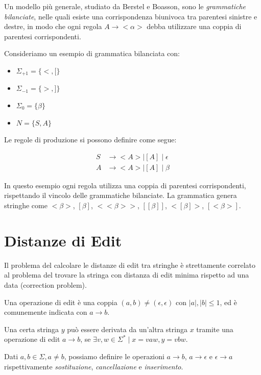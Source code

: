 \documentclass[a4paper,12pt]{report}
\begin{document}
    Un modello più generale, studiato da Berstel e Boasson, sono le \textit{grammatiche bilanciate}, nelle quali esiste una corrispondenza biunivoca tra parentesi sinistre e destre, in modo che ogni regola $A \rightarrow <\alpha>$ debba utilizzare una coppia di parentesi corrispondenti.
    
    Consideriamo un esempio di grammatica bilanciata con:
    \begin{itemize}
        \item $\Sigma_{+1} = \{<, [\}$
        \item $\Sigma_{-1} = \{>, ]\}$
        \item $\Sigma_0 = \{\beta\}$
        \item $N = \{S, A\}$
    \end{itemize}
    
    Le regole di produzione si possono definire come segue:
    
    \begin{align}
        S &\rightarrow < A > \mid [A] \mid \epsilon \\
        A &\rightarrow < A > \mid [A] \mid \beta
    \end{align}
    
    In questo esempio ogni regola utilizza una coppia di parentesi corrispondenti, rispettando il vincolo delle grammatiche bilanciate. La grammatica genera stringhe come $<\beta>$, $[\beta]$, $<<\beta>>$, $[[\beta]]$, $<[\beta]>$, $[<\beta>]$.

    \section{Distanze di Edit}

    Il problema del calcolare le distanze di edit tra stringhe è strettamente correlato al problema del trovare la stringa con distanza di edit minima rispetto ad una data (correction problem).
    
    Una operazione di edit è una coppia $(a, b) \neq (\epsilon, \epsilon)$ con $\lvert a \rvert, \lvert b \rvert \leq 1$, ed è comunemente indicata con
    $a \rightarrow b$. 
    
    Una certa stringa $y$ può essere derivata da un'altra stringa $x$ tramite una operazione di edit $a \rightarrow b$, se $\exists v, w \in \Sigma^* \mid x = vaw, y = vbw$.
    
    Dati $a, b \in \Sigma, a \neq b$, possiamo definire le operazioni $a \rightarrow b$, $a \rightarrow \epsilon$ e $\epsilon \rightarrow a$ rispettivamente
    \textit{sostituzione}, \textit{cancellazione} e \textit{inserimento}.
    
\end{document}
